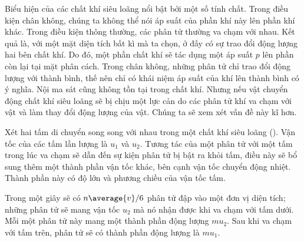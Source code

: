 Biểu hiện của các chất khí siêu loãng nổi bật bởi một số tính chất. Trong điều kiện chân không, chúng ta không thể nói áp suất của phần khí này lên phần khí khác. Trong điều kiện thông thường, các phân tử thường va chạm với nhau. Kết quả là, với một mặt diện tích bất kì mà ta chọn, ở đấy có sự trao đổi động lượng hai bên chất khí. Do đó, một phần chất khí sẽ tác dụng một áp suất $p$ lên phần còn lại tại mặt phân cách. Trong chân không, những phân tử chỉ trao đổi động lượng với thành bình, thế nên chỉ có khái niệm áp suất của khí lên thành bình có ý nghĩa. Nội ma sát cũng không tồn tại trong chất khí. Nhưng nếu vật chuyển động chất khí siêu loãng sẽ bị chịu một lực cản do các phân tử khí va chạm với vật và làm thay đổi động lượng của vật. Chúng ta sẽ xem xét vấn đề này kĩ hơn.

Xét hai tấm di chuyển song song với nhau trong một chất khí siêu loãng (). Vận tốc của các tấm lần lượng là $u_1$ và $u_2$. Tương tác của một phân tử với một tấm trong lúc va chạm sẽ dẫn đến sự kiện phân tử bị bật ra khỏi tấm, điều này sẽ bổ sung thêm một thành phần vận tốc khác, bên cạnh vận tốc chuyển động nhiệt. Thành phần này có độ lớn và phương chiều của vận tốc tấm.

Trong một giây sẽ có $n\average{v}/6$ phân tử đập vào một đơn vị diện tích; những phân tử sẽ mang vận tốc $u_2$ mà nó nhận được khi va chạm với tấm dưới. Mỗi một phân tử này mang một thành phần động lượng $mu_2$. Sau khi va chạm với tấm trên, phân tử sẽ có thành phần động lượng là $mu_1$.

